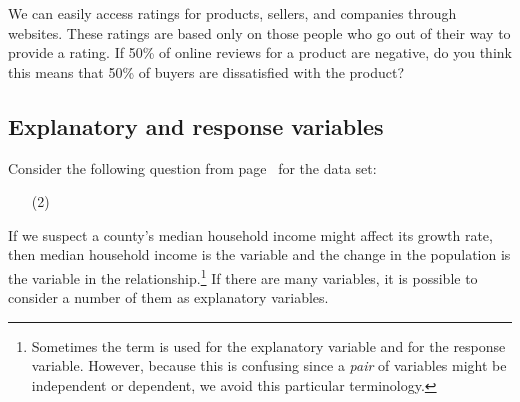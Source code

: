 \begin{exercisewrap}
\begin{nexercise}
We can easily access ratings for products, sellers, and companies through websites. These ratings are based only on those people who go out of their way to provide a rating. If 50\% of online reviews for a product are negative, do you think this means that 50\% of buyers are dissatisfied with the product?\footnotemark
\end{nexercise}
\end{exercisewrap}



\newpage


\subsection{Explanatory and response variables}
\label{explanatoryAndResponse}


\noindent%
Consider the following question from
page~\pageref{pop_change_v_median_hh_income_question}
for the  data set:
\begin{enumerate}
\item[(2)]
    \popchangevmedianhhincomequestion{}
\end{enumerate}
If we suspect a county's median household income might affect
its growth rate,
then median household income is the
variable and the change in the population is the
 variable in the
relationship.\footnote{Sometimes the term
 is used for
the explanatory variable and  for
the response variable.
However, because this is confusing since a \emph{pair} of
variables might be independent or dependent, we avoid this
particular terminology.}
If there are many variables, it is possible to consider
a number of them as explanatory variables.


